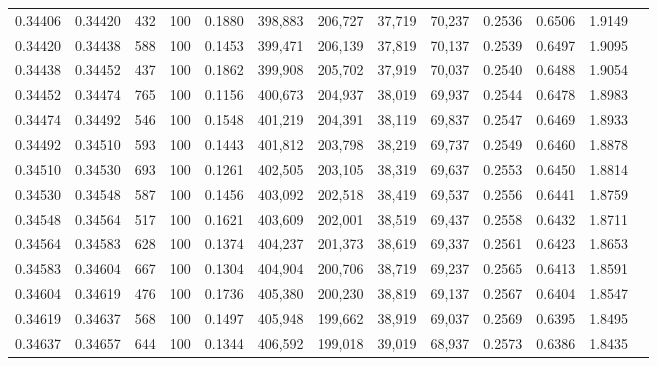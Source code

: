 \begin{tabular}{rrrrrrrrrrrrr}
0.34406 & 0.34420 &   432 & 100 &                                     0.1880 & 398,883 & 206,727 &  37,719 &  70,237 & 0.2536 & 0.6506 & 1.9149 \\
0.34420 & 0.34438 &   588 & 100 &                                     0.1453 & 399,471 & 206,139 &  37,819 &  70,137 & 0.2539 & 0.6497 & 1.9095 \\
0.34438 & 0.34452 &   437 & 100 &                                     0.1862 & 399,908 & 205,702 &  37,919 &  70,037 & 0.2540 & 0.6488 & 1.9054 \\
0.34452 & 0.34474 &   765 & 100 &                                     0.1156 & 400,673 & 204,937 &  38,019 &  69,937 & 0.2544 & 0.6478 & 1.8983 \\
0.34474 & 0.34492 &   546 & 100 &                                     0.1548 & 401,219 & 204,391 &  38,119 &  69,837 & 0.2547 & 0.6469 & 1.8933 \\
0.34492 & 0.34510 &   593 & 100 &                                     0.1443 & 401,812 & 203,798 &  38,219 &  69,737 & 0.2549 & 0.6460 & 1.8878 \\
0.34510 & 0.34530 &   693 & 100 &                                     0.1261 & 402,505 & 203,105 &  38,319 &  69,637 & 0.2553 & 0.6450 & 1.8814 \\
0.34530 & 0.34548 &   587 & 100 &                                     0.1456 & 403,092 & 202,518 &  38,419 &  69,537 & 0.2556 & 0.6441 & 1.8759 \\
0.34548 & 0.34564 &   517 & 100 &                                     0.1621 & 403,609 & 202,001 &  38,519 &  69,437 & 0.2558 & 0.6432 & 1.8711 \\
0.34564 & 0.34583 &   628 & 100 &                                     0.1374 & 404,237 & 201,373 &  38,619 &  69,337 & 0.2561 & 0.6423 & 1.8653 \\
0.34583 & 0.34604 &   667 & 100 &                                     0.1304 & 404,904 & 200,706 &  38,719 &  69,237 & 0.2565 & 0.6413 & 1.8591 \\
0.34604 & 0.34619 &   476 & 100 &                                     0.1736 & 405,380 & 200,230 &  38,819 &  69,137 & 0.2567 & 0.6404 & 1.8547 \\
0.34619 & 0.34637 &   568 & 100 &                                     0.1497 & 405,948 & 199,662 &  38,919 &  69,037 & 0.2569 & 0.6395 & 1.8495 \\
0.34637 & 0.34657 &   644 & 100 &                                     0.1344 & 406,592 & 199,018 &  39,019 &  68,937 & 0.2573 & 0.6386 & 1.8435 \\

\end{tabular}
